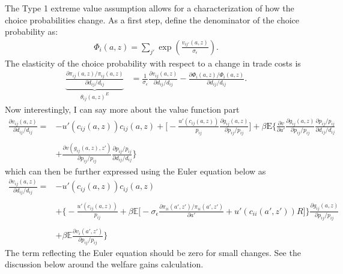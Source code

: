 \documentclass[12pt,pdftex]{article}
\begin{document}
\begin{onehalfspacing}
The Type 1 extreme value assumption allows for a characterization of how the choice probabilities change. As a first step, define the denominator of the choice probability as:
\begin{align}
\Phi_{i}(a,z) = \sum_{j'} \exp \left( \frac{ v_{ij'}(a, z) }{\sigma_{\epsilon}} \right).
\end{align}
The elasticity of the choice probability with respect to a change in trade costs is
\begin{align}
\underbrace{ \frac{\partial \pi_{ij}(a,z) / \pi_{ij}(a,z)}{\partial d_{ij} / d_{ij}} }_{\theta_{ij}(a,z)^{E}} &= \frac{1}{\sigma_{\epsilon}}\frac{\partial v_{ij}(a,z)}{\partial d_{ij}/d_{ij}} -  \frac{\partial \Phi_{i}(a,z) / \Phi_{i}(a,z)}{\partial d_{ij}/d_{ij}}.
\label{eq:apx-extensive-margin}
\end{align}
Now interestingly, I can say more about the value function part
\begin{align}
\frac{\partial v_{ij}(a,z)}{\partial d_{ij}/d_{ij}}  =& -u'(c_{ij}(a,z))c_{ij}(a,z) + \bigg [ -\frac{u'(c_{ij}(a,z))}{p_{ij}}\frac{\partial g_{ij}(a,z)}{\partial p_{ij}/ p_{ij}} \bigg ] + \beta \mathrm{E} \bigg \{\frac{\partial v}{\partial a'}\frac{\partial g_{ij}(a,z)}{\partial p_{ij}/ p_{ij}}\frac{ \partial p_{ij}/ p_{ij}}{\partial d_{ij}/ d_{ij}}  \\
\nonumber \\
&+  \frac{\partial v(g_{ij}(a,z),z')}{\partial p_{ij}/ p_{ij}}\frac{ \partial p_{ij}/ p_{ij}}{\partial d_{ij}/ d_{ij}} \bigg \}
\end{align}
which can then be further expressed using the Euler equation below as
\begin{align}
\frac{\partial v_{ij}(a,z)}{\partial d_{ij}/d_{ij}}  =& -u'(c_{ij}(a,z))c_{ij}(a,z) \\
\nonumber \\
&+ \bigg \{ -\frac{u'(c_{ij}(a,z))}{p_{ij}} + \beta \mathbb{E} \bigg [ -\sigma_{\epsilon} \frac{\partial \pi_{ii}(a',z') / \pi_{ii}(a',z')}{\partial a'} + u'(c_{ii}(a',z'))R \bigg ] \bigg \} \frac{\partial g_{ij}(a,z)}{\partial p_{ij}/ p_{ij}} \\
\nonumber \\
&+  \beta \mathbb{E}\frac{\partial v_{i}(a',z')}{\partial p_{ij}/ p_{ij}} \bigg \}
\end{align}
The term reflecting the Euler equation should be zero for small changes. See the discussion below around the welfare gains calculation.



\end{onehalfspacing}
\end{document}
